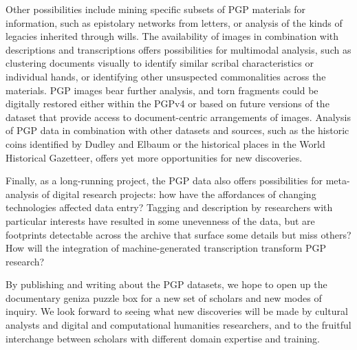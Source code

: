 \documentclass{article}
\begin{document}
Other possibilities include mining specific subsets of PGP materials for information, such as epistolary networks from letters, or analysis of the kinds of legacies inherited through wills. The availability of images in combination with descriptions and transcriptions offers possibilities for multimodal analysis, such as clustering documents visually to identify similar scribal characteristics or individual hands, or identifying other unsuspected commonalities across the materials. PGP images bear further analysis, and torn fragments could be digitally restored either within the PGPv4 or based on future versions of the dataset that provide access to document-centric arrangements of images. Analysis of PGP data in combination with other datasets and sources, such as the historic coins identified by Dudley and Elbaum or the historical places in the World Historical Gazetteer, offers yet more opportunities for new discoveries.

Finally, as a long-running project, the PGP data also offers possibilities for meta-analysis of digital research projects: how have the affordances of changing technologies affected data entry? Tagging and description by researchers with particular interests have resulted in some unevenness of the data, but are footprints detectable across the archive that surface some details but miss others? How will the integration of machine-generated transcription transform PGP research?

By publishing and writing about the PGP datasets, we hope to open up the documentary geniza puzzle box for a new set of scholars and new modes of inquiry. We look forward to seeing what new discoveries will be made by cultural analysts and digital and computational humanities researchers, and to the fruitful interchange between scholars with different domain expertise and training.

\pagebreak
{}

\printbibliography[prenote={preamble}]
\end{document}
